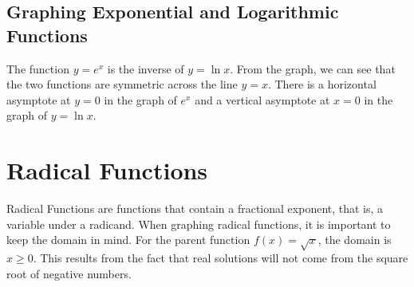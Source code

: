 \documentclass{article}
\begin{document}
    \subsection{Graphing Exponential and Logarithmic Functions}

    The function $y=e^x$ is the inverse of $y=\ln{x}$. From the graph, we can see that the
    two functions are symmetric across the line $y=x$. There is a horizontal asymptote at
    $y=0$ in the graph of $e^x$ and a vertical asymptote at $x=0$ in the graph of $y=\ln{x}$.

    \begin{center}
    \end{center}

    \pagebreak


    \section{Radical Functions}

    Radical Functions are functions that contain a fractional exponent, that is, a variable
    under a radicand. When graphing radical functions, it is important to keep the domain in
    mind. For the parent function $f(x)=\sqrt{x}$, the domain is $x\geq 0$. This results from
    the fact that real solutions will not come from the square root of negative numbers. \\
\end{document}
